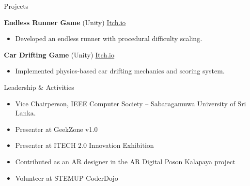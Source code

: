 \documentclass{resume} %
\begin{document}
\begin{rSection}{Projects}
\item \textbf{Endless Runner Game} (Unity) \hfill \href{https://sachindu-nethmin.itch.io/runner-of-the-maze}{Itch.io}
\begin{itemize}
    \itemsep -3pt {}
    \item Developed an endless runner with procedural difficulty scaling.
\end{itemize}

\item \textbf{Car Drifting Game} (Unity) \hfill \href{https://sachindu-nethmin.itch.io/rivals}{Itch.io}
\begin{itemize}
    \itemsep -3pt {}
    \item Implemented physics-based car drifting mechanics and scoring system.
\end{itemize}
\end{rSection}

\begin{rSection}{Leadership \& Activities}
\begin{itemize}
    \itemsep -3pt {}
    \item Vice Chairperson, IEEE Computer Society – Sabaragamuwa University of Sri Lanka.
    \item Presenter at GeekZone v1.0
    \item Presenter at ITECH 2.0 Innovation Exhibition
    \item Contributed as an AR designer in the AR Digital Poson Kalapaya project
    \item Volunteer at STEMUP CoderDojo
\end{itemize}
\end{rSection}
\end{document}
